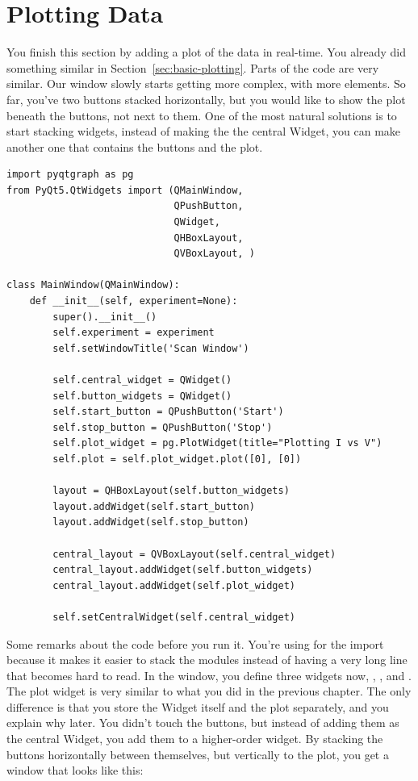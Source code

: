 

\section{Plotting Data}\label{sec:plotting-data}
You finish this section by adding a plot of the data in real-time. You already did something similar in Section~\ref{sec:basic-plotting}. Parts of the code are very similar. Our window slowly starts getting more complex, with more elements. So far, you've two buttons stacked horizontally, but you would like to show the plot beneath the buttons, not next to them. One of the most natural solutions is to start stacking widgets, instead of making the  the central Widget, you can make another one that contains the buttons and the plot.

\begin{verbatim}
import pyqtgraph as pg
from PyQt5.QtWidgets import (QMainWindow,
                             QPushButton,
                             QWidget,
                             QHBoxLayout,
                             QVBoxLayout, )

class MainWindow(QMainWindow):
    def __init__(self, experiment=None):
        super().__init__()
        self.experiment = experiment
        self.setWindowTitle('Scan Window')

        self.central_widget = QWidget()
        self.button_widgets = QWidget()
        self.start_button = QPushButton('Start')
        self.stop_button = QPushButton('Stop')
        self.plot_widget = pg.PlotWidget(title="Plotting I vs V")
        self.plot = self.plot_widget.plot([0], [0])

        layout = QHBoxLayout(self.button_widgets)
        layout.addWidget(self.start_button)
        layout.addWidget(self.stop_button)

        central_layout = QVBoxLayout(self.central_widget)
        central_layout.addWidget(self.button_widgets)
        central_layout.addWidget(self.plot_widget)

        self.setCentralWidget(self.central_widget)
\end{verbatim}

Some remarks about the code before you run it. You're using \py{()} for the import because it makes it easier to stack the modules instead of having a very long line that becomes hard to read. In the window, you define three widgets now, , , and . The plot widget is very similar to what you did in the previous chapter. The only difference is that you store the Widget itself and the plot separately, and you explain why later. You didn't touch the buttons, but instead of adding them as the central Widget, you add them to a higher-order widget. By stacking the buttons horizontally between themselves, but vertically to the plot, you get a window that looks like this:

